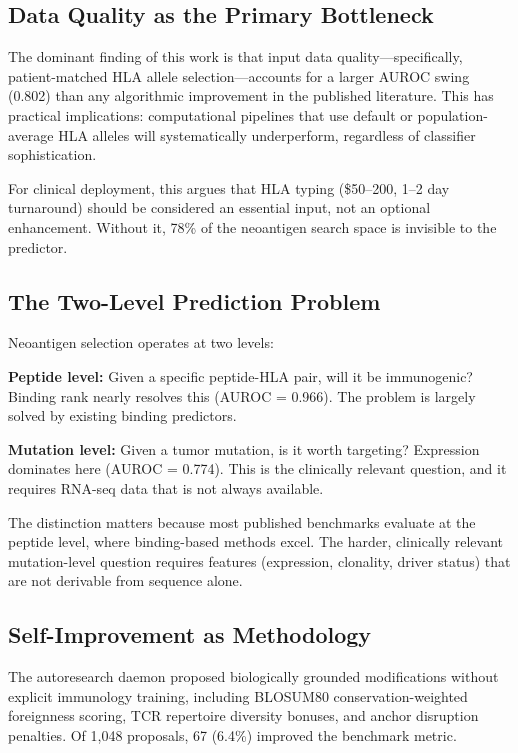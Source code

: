 \documentclass[11pt,twocolumn]{article}
\begin{document}
\subsection{Data Quality as the Primary Bottleneck}

The dominant finding of this work is that input data quality---specifically, patient-matched HLA allele selection---accounts for a larger AUROC swing (0.802) than any algorithmic improvement in the published literature. This has practical implications: computational pipelines that use default or population-average HLA alleles will systematically underperform, regardless of classifier sophistication.

For clinical deployment, this argues that HLA typing (\$50--200, 1--2 day turnaround) should be considered an essential input, not an optional enhancement. Without it, 78\% of the neoantigen search space is invisible to the predictor.

\subsection{The Two-Level Prediction Problem}

Neoantigen selection operates at two levels:

\textbf{Peptide level:} Given a specific peptide-HLA pair, will it be immunogenic? Binding rank nearly resolves this (AUROC = 0.966). The problem is largely solved by existing binding predictors.

\textbf{Mutation level:} Given a tumor mutation, is it worth targeting? Expression dominates here (AUROC = 0.774). This is the clinically relevant question, and it requires RNA-seq data that is not always available.

The distinction matters because most published benchmarks evaluate at the peptide level, where binding-based methods excel. The harder, clinically relevant mutation-level question requires features (expression, clonality, driver status) that are not derivable from sequence alone.

\subsection{Self-Improvement as Methodology}

The autoresearch daemon proposed biologically grounded modifications without explicit immunology training, including BLOSUM80 conservation-weighted foreignness scoring, TCR repertoire diversity bonuses, and anchor disruption penalties. Of 1,048 proposals, 67 (6.4\%) improved the benchmark metric.
\end{document}

